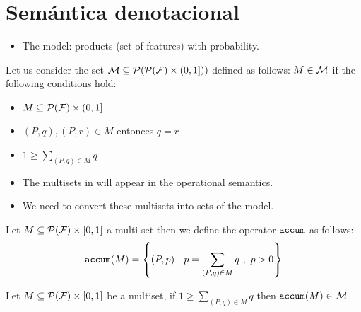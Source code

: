 \section{Semántica denotacional}
\label{sec:stat:den}

\begin{itemize}
\item The model: products (set of features) with probability.
\end{itemize}



\bdfn\label{def:den:pr}
  Let us consider the set ${\cal M}\subseteq{\cal P}({\cal P}({\cal F})\times
  (0,1]))$ defined as follows: $M\in{\cal M}$ if the following
  conditions hold:
  \begin{itemize}
  \item $M\subseteq {\cal P}({\cal F})\times (0,1]$ \\
  \item $(P,q),(P,r)\in M$ entonces $q=r$ \\
  \item $1\geq\sum_{(P,q)\in M} q$ \\
  \end{itemize}
\edfn

\begin{itemize}
\item The multisets in will appear in the operational semantics.
\item We need to convert these multisets into sets of the model.
\end{itemize}

\bdfn
  Let $M \subseteq {\cal P}({\cal F})\times [0,1]$ a multi set then we
  define the operator $\mathtt{accum}$ as follows:
  $$\mathtt{accum}(M) = \left\{(P,p)\ | \ p=\sum_{(P,q)\in M}q\ ,\ p>0\right\}$$

\edfn
\bprop\label{prop:pr:accum}
 Let $M\subseteq {\cal P}({\cal F})\times [0,1]$ be a multiset, if $1\geq\sum_{(P,q)\in M} q$
 then $\mathtt{accum}(M)\in{\cal M}$.
\eprop




 

